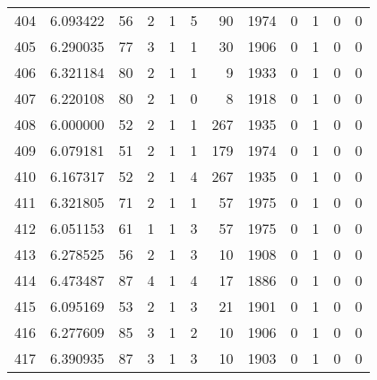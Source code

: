\begin{tabular}{lrrrrrrrrrrr}
404 &  6.093422 &   56 &      2 &        1 &      5 &              90 &  1974 &               0 &               1 &               0 &               0 \\
405 &  6.290035 &   77 &      3 &        1 &      1 &              30 &  1906 &               0 &               1 &               0 &               0 \\
406 &  6.321184 &   80 &      2 &        1 &      1 &               9 &  1933 &               0 &               1 &               0 &               0 \\
407 &  6.220108 &   80 &      2 &        1 &      0 &               8 &  1918 &               0 &               1 &               0 &               0 \\
408 &  6.000000 &   52 &      2 &        1 &      1 &             267 &  1935 &               0 &               1 &               0 &               0 \\
409 &  6.079181 &   51 &      2 &        1 &      1 &             179 &  1974 &               0 &               1 &               0 &               0 \\
410 &  6.167317 &   52 &      2 &        1 &      4 &             267 &  1935 &               0 &               1 &               0 &               0 \\
411 &  6.321805 &   71 &      2 &        1 &      1 &              57 &  1975 &               0 &               1 &               0 &               0 \\
412 &  6.051153 &   61 &      1 &        1 &      3 &              57 &  1975 &               0 &               1 &               0 &               0 \\
413 &  6.278525 &   56 &      2 &        1 &      3 &              10 &  1908 &               0 &               1 &               0 &               0 \\
414 &  6.473487 &   87 &      4 &        1 &      4 &              17 &  1886 &               0 &               1 &               0 &               0 \\
415 &  6.095169 &   53 &      2 &        1 &      3 &              21 &  1901 &               0 &               1 &               0 &               0 \\
416 &  6.277609 &   85 &      3 &        1 &      2 &              10 &  1906 &               0 &               1 &               0 &               0 \\
417 &  6.390935 &   87 &      3 &        1 &      3 &              10 &  1903 &               0 &               1 &               0 &               0 \\

\end{tabular}
